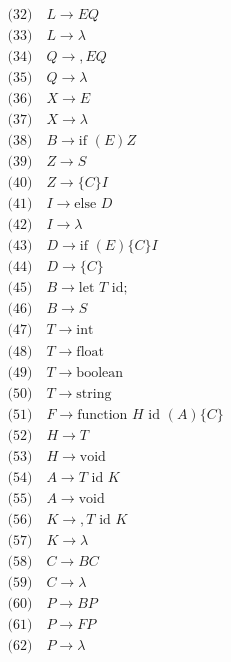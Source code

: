 \documentclass{article}
\begin{document}
\hfill
\begin{minipage}[t]{0.48\textwidth}
\small
\[ \begin{aligned}
    &\text{(32)} \quad L \to E Q  \\
    &\text{(33)} \quad L \to \lambda \\
    &\text{(34)} \quad Q \to , E Q \\
    &\text{(35)} \quad Q \to \lambda \\
    &\text{(36)} \quad X \to E \\
    &\text{(37)} \quad X \to \lambda \\
    &\text{(38)} \quad B \to \text{if } ( E ) Z \\
    &\text{(39)} \quad Z \to S \\
    &\text{(40)} \quad Z \to \{ C \} I \\
    &\text{(41)} \quad I \to \text{else } D \\
    &\text{(42)} \quad I \to \lambda \\
    &\text{(43)} \quad D \to \text{if } ( E ) \{ C \} I \\
    &\text{(44)} \quad D \to \{ C \} \\
    &\text{(45)} \quad B \to \text{let } T \text{ id} ; \\
    &\text{(46)} \quad B \to S \\
    &\text{(47)} \quad T \to \text{int} \\
    &\text{(48)} \quad T \to \text{float} \\
    &\text{(49)} \quad T \to \text{boolean} \\
    &\text{(50)} \quad T \to \text{string} \\
    &\text{(51)} \quad F \to \text{function } H \text{ id } ( A ) \{ C \} \\
    &\text{(52)} \quad H \to T \\
    &\text{(53)} \quad H \to \text{void} \\
    &\text{(54)} \quad A \to T \text{ id } K \\
    &\text{(55)} \quad A \to \text{void} \\
    &\text{(56)} \quad K \to , T \text{ id } K \\
    &\text{(57)} \quad K \to \lambda \\
    &\text{(58)} \quad C \to B C \\
    &\text{(59)} \quad C \to \lambda \\
    &\text{(60)} \quad P \to B P \\
    &\text{(61)} \quad P \to F P \\
    &\text{(62)} \quad P \to \lambda
\end{aligned} \]
\end{minipage}
\end{document}
